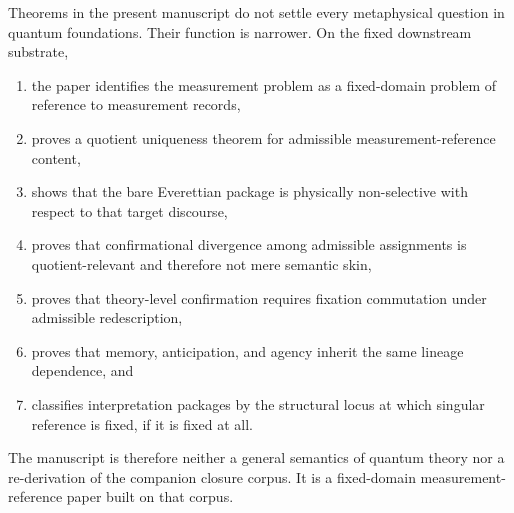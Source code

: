 Theorems in the present manuscript do not settle every metaphysical question in quantum
foundations. Their function is narrower. On the fixed downstream substrate,
\begin{enumerate}
    \item the paper identifies the measurement problem as a fixed-domain problem of reference to
    measurement records,
    \item proves a quotient uniqueness theorem for admissible measurement-reference content,
    \item shows that the bare Everettian package is physically non-selective with respect to that
    target discourse,
    \item proves that confirmational divergence among admissible assignments is quotient-relevant and
    therefore not mere semantic skin,
    \item proves that theory-level confirmation requires fixation commutation under admissible
    redescription,
    \item proves that memory, anticipation, and agency inherit the same lineage dependence, and
    \item classifies interpretation packages by the structural locus at which singular reference is fixed,
    if it is fixed at all.
\end{enumerate}
The manuscript is therefore neither a general semantics of quantum theory nor a re-derivation of the
companion closure corpus. It is a fixed-domain measurement-reference paper built on that corpus.
